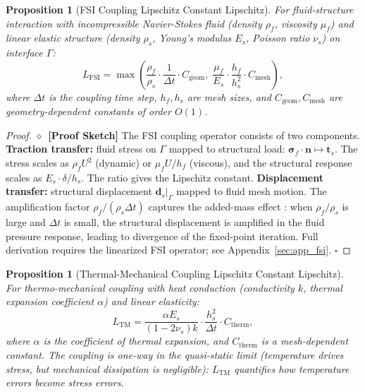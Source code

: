 \documentclass[11pt,a4paper]{article}
\newtheorem{proposition}[theorem]{Proposition}
\theoremstyle{definition}
\newcommand{\rigorSketch}[0]{$\diamond$~\textbf{[Proof Sketch]}}
\newcommand{\interface}{\Gamma}
\begin{document}
\begin{proposition}[FSI Coupling Lipschitz Constant Lipschitz]\label{prop:fsi_lipschitz}
For fluid-structure interaction with incompressible Navier-Stokes fluid (density $\rho_f$, viscosity $\mu_f$) and linear elastic structure (density $\rho_s$, Young's modulus $E_s$, Poisson ratio $\nu_s$) on interface $\interface$:
\begin{equation}\label{eq:L_FSI}
L_{\mathrm{FSI}} = \max\left(\frac{\rho_f}{\rho_s} \cdot \frac{1}{\Delta t} \cdot C_{\mathrm{geom}}, \; \frac{\mu_f}{E_s} \cdot \frac{h_f}{h_s^2} \cdot C_{\mathrm{mesh}}\right),
\end{equation}
where $\Delta t$ is the coupling time step, $h_f, h_s$ are mesh sizes, and $C_{\mathrm{geom}}, C_{\mathrm{mesh}}$ are geometry-dependent constants of order $O(1)$.
\end{proposition}

\begin{proof}\rigorSketch
The FSI coupling operator consists of two components. \textbf{Traction transfer:} fluid stress on $\interface$ mapped to structural load: $\boldsymbol{\sigma}_f \cdot \mathbf{n} \mapsto \mathbf{t}_s$. The stress scales as $\rho_f U^2$ (dynamic) or $\mu_f U/h_f$ (viscous), and the structural response scales as $E_s \cdot \delta / h_s$. The ratio gives the Lipschitz constant. \textbf{Displacement transfer:} structural displacement $\mathbf{d}_s|_\interface$ mapped to fluid mesh motion. The amplification factor $\rho_f/(\rho_s \Delta t)$ captures the added-mass effect \cite{Causin2005}: when $\rho_f/\rho_s$ is large and $\Delta t$ is small, the structural displacement is amplified in the fluid pressure response, leading to divergence of the fixed-point iteration. Full derivation requires the linearized FSI operator; see Appendix~\ref{sec:app_fsi}. $\square$
\end{proof}

\begin{proposition}[Thermal-Mechanical Coupling Lipschitz Constant Lipschitz]\label{prop:therm_mech_lipschitz}
For thermo-mechanical coupling with heat conduction (conductivity $k$, thermal expansion coefficient $\alpha$) and linear elasticity:
\begin{equation}\label{eq:L_TM}
L_{\mathrm{TM}} = \frac{\alpha E_s}{(1-2\nu_s)k} \cdot \frac{h_s^2}{\Delta t} \cdot C_{\mathrm{therm}},
\end{equation}
where $\alpha$ is the coefficient of thermal expansion, and $C_{\mathrm{therm}}$ is a mesh-dependent constant. The coupling is one-way in the quasi-static limit (temperature drives stress, but mechanical dissipation is negligible): $L_{\mathrm{TM}}$ quantifies how temperature errors become stress errors.
\end{proposition}
\end{document}
